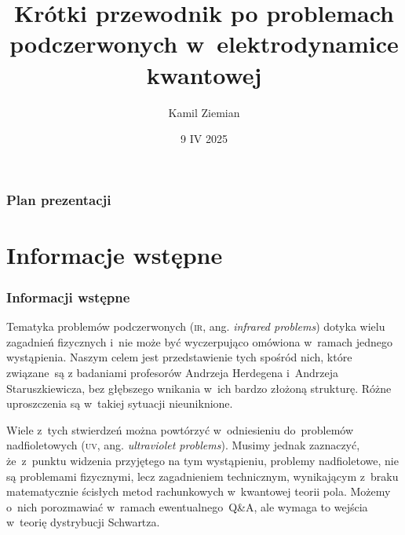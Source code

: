 \documentclass[10pt,t]{beamer}
\title{Krótki przewodnik po problemach podczerwonych
  w~elektrodynamice kwantowej}
\author{Kamil Ziemian \\
  \email}
\date[9 IV 2025]{9 IV 2025}
\begin{document}





\RaggedRight





\maketitle





\begin{frame}
  \frametitle{Plan prezentacji}


  \tableofcontents

\end{frame}










\section{Informacje wstępne}


\begin{frame}
  \frametitle{Informacji wstępne}


  Tematyka problemów podczerwonych (\textsc{ir}, ang. \textit{infrared
    problems}) dotyka wielu zagadnień fizycznych i~nie może być
  wyczerpująco omówiona w~ramach jednego wystąpienia. Naszym
  celem jest przedstawienie tych spośród nich, które związane~są z
  badaniami profesorów Andrzeja Herdegena i~Andrzeja Staruszkiewicza, bez
  głębszego wnikania w~ich bardzo złożoną strukturę. Różne uproszczenia są
  w~takiej sytuacji nieuniknione.

  Wiele z~tych stwierdzeń można powtórzyć w~odniesieniu do~problemów
  nadfioletowych (\textsc{uv}, ang. \textit{ultraviolet problems}). Musimy
  jednak zaznaczyć, że~z~punktu widzenia przyjętego na tym wystąpieniu,
  problemy nadfioletowe, \alert{nie} są problemami fizycznymi, lecz
  zagadnieniem technicznym, wynikającym z~braku matematycznie ścisłych metod
  rachunkowych w~kwantowej teorii pola. Możemy o~nich porozmawiać
  w~ramach ewentualnego~Q\&A, ale wymaga to wejścia w~teorię dystrybucji
  Schwartza.


\end{frame}
\end{document}
